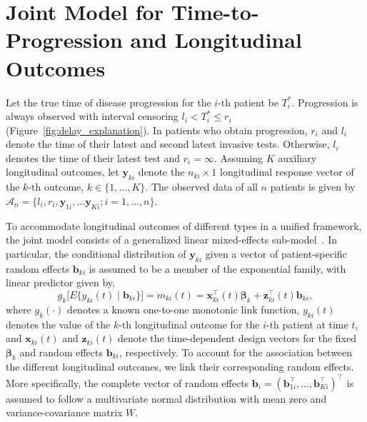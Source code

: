 \section{Joint Model for Time-to-Progression and Longitudinal Outcomes}
\label{sec:jointmodel}
Let the true time of disease progression for the ${i\mbox{-th}}$ patient be $T_i^*$. Progression is always observed with interval censoring ${l_i < T_i^* \leq r_i}$ (Figure~\ref{fig:delay_explanation}). In patients who obtain progression, $r_i$ and $l_i$ denote the time of their latest and second latest invasive tests. Otherwise, $l_i$ denotes the time of their latest test and ${r_i=\infty}$. Assuming $K$ auxiliary longitudinal outcomes, let $\boldsymbol{y}_{ki}$ denote the ${n_{ki} \times 1}$ longitudinal response vector of the ${k\mbox{-th}}$ outcome, $k \in \{1, \ldots, K\}$. The observed data of all $n$ patients is given by ${\mathcal{A}_n = \{l_i, r_i, \boldsymbol{y}_{1i},\ldots \boldsymbol{y}_{Ki}; i = 1, \ldots, n\}}$.

To accommodate longitudinal outcomes of different types in a unified framework, the joint model consists of a generalized linear mixed-effects sub-model~\citep{mcculloch2005generalized}. In particular, the conditional distribution of $\boldsymbol{y}_{ki}$ given a vector of patient-specific random effects $\boldsymbol{b}_{ki}$ is assumed to be a member of the exponential family, with linear predictor given by,
\begin{equation*}
\label{eq:long_model}
g_k\big[E\{y_{ki} (t) \mid \boldsymbol{b}_{ki}\}\big] = m_{ki}(t) = \boldsymbol{x}_{ki}^{\top}(t)\boldsymbol{\beta}_{k} + \boldsymbol{z}_{ki}^{\top}(t)\boldsymbol{b}_{ki},
\end{equation*}
where $g_k(\cdot)$ denotes a known one-to-one monotonic link function, $y_{ki}(t)$ denotes the
value of the ${k\mbox{-th}}$ longitudinal outcome for the ${i\mbox{-th}}$ patient at time $t$, and $\boldsymbol{x}_{ki}(t)$ and $\boldsymbol{z}_{ki}(t)$ denote the time-dependent design vectors for the fixed $\boldsymbol{\beta}_{k}$ and random effects $\boldsymbol{b}_{ki}$, respectively. To account for the association between the different longitudinal outcomes, we link their corresponding random effects. More specifically, the complete vector of random effects ${\boldsymbol{b}_{i} = (\boldsymbol{b}_{1i}^{\top}, \ldots, \boldsymbol{b}_{Ki}^{\top})^{\top}}$ is assumed to follow a multivariate normal distribution with mean zero and variance-covariance matrix $W$.

